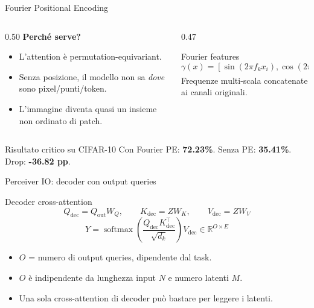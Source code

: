 \documentclass[aspectratio=169,10pt]{beamer}
\newcommand{\R}{\mathbb{R}}
\newcommand{\softmax}{\operatorname{softmax}}
\begin{document}
\begin{frame}{Fourier Positional Encoding}
\small
\begin{columns}[T]
\begin{column}{0.50\textwidth}
\textbf{Perché serve?}
\begin{itemize}
  \item L'attention è permutation-equivariant.
  \item Senza posizione, il modello non sa \emph{dove} sono pixel/punti/token.
  \item L'immagine diventa quasi un insieme non ordinato di patch.
\end{itemize}
\end{column}
\begin{column}{0.47\textwidth}
\begin{block}{Fourier features}
\[
\gamma(x)=
\left[
\sin(2\pi f_k x_i),
\cos(2\pi f_k x_i)
\right]_{k,i}
\]
Frequenze multi-scala concatenate ai canali originali.
\end{block}
\end{column}
\end{columns}

\begin{alertblock}{Risultato critico su CIFAR-10}
Con Fourier PE: \textbf{72.23\%}. Senza PE: \textbf{35.41\%}. Drop: \textbf{-36.82 pp}.
\end{alertblock}
\end{frame}

\begin{frame}{Perceiver IO: decoder con output queries}
\small
\begin{block}{Decoder cross-attention}
\[
Q_{\text{dec}} = Q_{\text{out}} W_Q,\qquad
K_{\text{dec}} = Z W_K,\qquad
V_{\text{dec}} = Z W_V
\]
\[
Y =
\softmax\!\left(\frac{Q_{\text{dec}}K_{\text{dec}}^\top}{\sqrt{d_k}}\right)V_{\text{dec}}
\in \R^{O \times E}
\]
\end{block}

\begin{itemize}
  \item $O$ = numero di output queries, dipendente dal task.
  \item $O$ è indipendente da lunghezza input $N$ e numero latenti $M$.
  \item Una sola cross-attention di decoder può bastare per leggere i latenti.
\end{itemize}
\end{frame}
\end{document}
